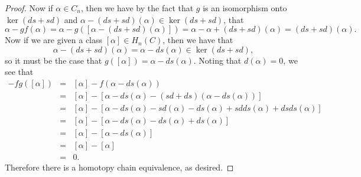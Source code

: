 \documentclass[10pt]{amsart}
\begin{document}
\begin{ex}
\begin{proof}
    Now if $\alpha \in C_n$, then we have by the fact that $g$ is an isomorphism onto $\ker (ds + sd)$ and $\alpha - (ds + sd)(\alpha) \in \ker (ds + sd)$, that
    $$\alpha - gf(\alpha) = \alpha - g([\alpha - (ds + sd)(\alpha)]) = \alpha - \alpha + (ds + sd)(\alpha) = (ds + sd)(\alpha).$$
    Now if we are given a class $[\alpha] \in H_n(C)$, then we have that
    $$\alpha - (ds + sd)(\alpha) = \alpha - ds(\alpha) \in \ker (ds + sd),$$
    so it must be the case that $g([\alpha]) = \alpha - ds(\alpha)$.
    Noting that $d(\alpha) = 0$, we see that
    \begin{eqnarray*}
      [\alpha] - fg([\alpha]) &=& [\alpha] - f(\alpha - ds(\alpha))\\
      &=& [\alpha] - [\alpha - ds(\alpha) - (sd + ds)(\alpha - ds(\alpha))]\\
      &=& [\alpha] - [\alpha - ds(\alpha) - sd(\alpha) - ds(\alpha) + sdds(\alpha) + dsds(\alpha)]\\
      &=& [\alpha] - [\alpha - ds(\alpha) - ds(\alpha) + ds(\alpha)]\\
      &=& [\alpha] - [\alpha - ds(\alpha)]\\
      &=& [\alpha] - [\alpha]\\
      &=& 0.
    \end{eqnarray*}
    Therefore there is a homotopy chain equivalence, as desired.
  \end{proof}
\end{ex}

\setcounter{ex}{3}
\end{document}
